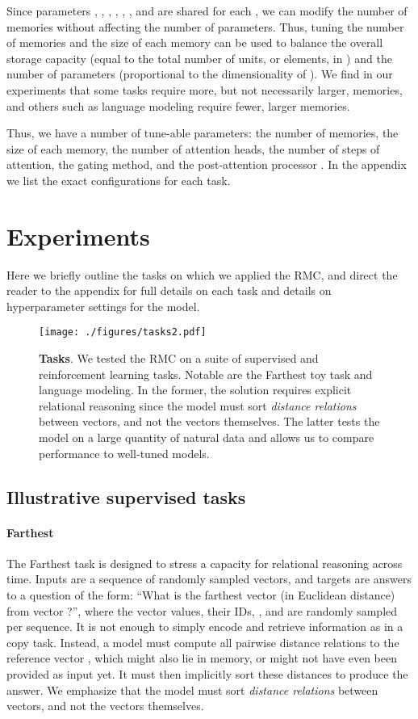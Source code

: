\documentclass{article}
\begin{document}
Since parameters , , , , , , and  are shared for each , we can modify the number of memories without affecting the number of parameters. Thus, tuning the number of memories and the size of each memory can be used to balance the overall storage capacity (equal to the total number of units, or elements, in ) and the number of parameters (proportional to the dimensionality of ). We find in our experiments that some tasks require more, but not necessarily larger, memories, and others such as language modeling require fewer, larger memories.

Thus, we have a number of tune-able parameters: the number of memories, the size of each memory, the number of attention heads, the number of steps of attention, the gating method, and the post-attention processor . In the appendix we list the exact configurations for each task. \section{Experiments}
Here we briefly outline the tasks on which we applied the RMC, and direct the reader to the appendix for full details on each task and details on hyperparameter settings for the model. 

\begin{figure}
    \centering
    \texttt{[image: ./figures/tasks2.pdf]}
    \caption{\textbf{Tasks}. We tested the RMC on a suite of supervised and reinforcement learning tasks. Notable are the  Farthest toy task and language modeling. In the former, the solution requires explicit relational reasoning since the model must sort \textit{distance relations} between vectors, and not the vectors themselves. The latter tests the model on a large quantity of natural data and allows us to compare performance to well-tuned models.}
    \label{fig:tasks}
\end{figure}

\subsection{Illustrative supervised tasks}
\paragraph{ Farthest}
The  Farthest task is designed to stress a capacity for relational reasoning across time. Inputs are a sequence of randomly sampled vectors, and targets are answers to a question of the form: ``What is the  farthest vector (in Euclidean distance) from vector ?'', where the vector values, their IDs, , and  are randomly sampled per sequence. It is not enough to simply encode and retrieve information as in a copy task. Instead, a model must compute all pairwise distance relations to the reference vector , which might also lie in memory, or might not have even been provided as input yet. It must then implicitly sort these distances to produce the answer. We emphasize that the model must sort \textit{distance relations} between vectors, and not the vectors themselves.
\end{document}
